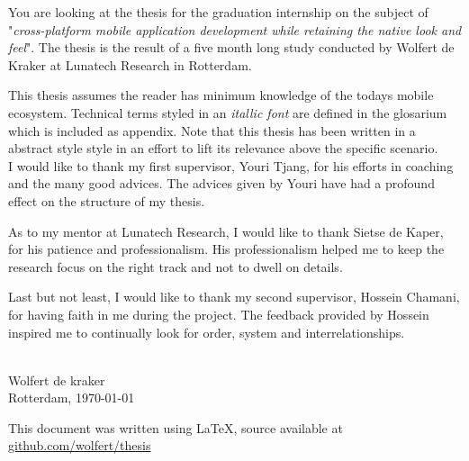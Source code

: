 \newpage
\thispagestyle{empty}
\mbox{}


You are looking at the thesis for the graduation internship on the subject of "\emph{cross-platform mobile application development while retaining the native look and feel}". The thesis is the result of a five month long study conducted by Wolfert de Kraker at Lunatech Research in Rotterdam.

This thesis assumes the reader has minimum knowledge of the todays mobile ecosystem. Technical terms styled in an \emph{itallic font} are defined in the glosarium which is included as appendix.
Note that this thesis has been written in a abstract style style in an effort to lift its relevance above the specific scenario.
~\\

\noindent I would like to thank my first supervisor, Youri Tjang, for his efforts in coaching and the many good advices. The advices given by Youri have had a profound effect on the structure of my thesis.

As to my mentor at Lunatech Research, I would like to thank Sietse de Kaper, for his patience and professionalism. His professionalism helped me to keep the research focus on the right track and not to dwell on details.

Last but not least, I would like to thank my second supervisor, Hossein Chamani, for having faith in me during the project. The feedback provided by Hossein inspired me to continually look for order, system and interrelationships.

~\\

\noindent Wolfert de kraker\\
Rotterdam, \today


\vfill
This document was written using \LaTeX{}, source available at {\url{github.com/wolfert/thesis}}
